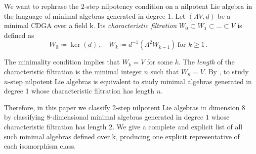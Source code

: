 \documentclass[10pt,reqno]{amsart}
\newcommand{\la}{\langle}
\newcommand{\ra}{\rangle}
\renewcommand{\L}{\Lambda}
\newcommand{\kk}{\mathrm{k}}
\newcommand{\tr}[1]{\textrm{#1}}
\theoremstyle{definition}
\begin{document}
We want to rephrase the 2-step nilpotency condition on a nilpotent Lie algebra in the language of minimal algebras generated in degree 1. Let $(\L V, d)$ be a minimal CDGA over a field $\kk$. Its {\em characteristic filtration} $W_0 \subset W_1 \subset \ldots \subset V$ is defined as 
\[
W_0\coloneqq \ker(d)\,, \quad W_k\coloneqq d^{-1}(\L^2 W_{k-1}) \ \tr{for } k \ge 1\,. 
\]

The minimality condition implies that $W_k=V$ for some $k$. The {\em length} of the characteristic filtration is the minimal integer $n$ such that $W_n=V$. By \cite[Lemma 3]{B}, to study $n$-step nilpotent Lie algebras is equivalent to study minimal algebras generated in degree 1 whose characteristic filtration has length $n$.

Therefore, in this paper we classify 2-step nilpotent Lie algebras in dimension 8 by classifying 8-dimensional minimal algebras generated in degree $1$ whose characteristic filtration has length 2. We give a complete and explicit list of all such minimal algebras defined over $\kk$, producing one explicit representative of each isomorphism class.






\end{document}
